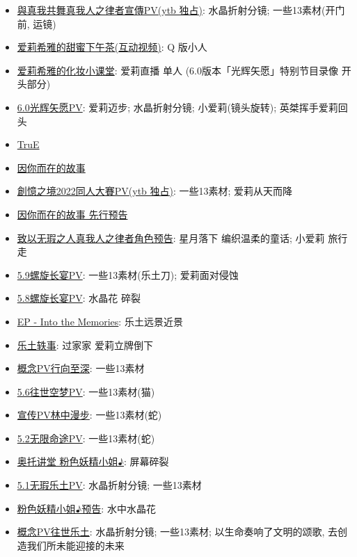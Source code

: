 \documentclass[a4paper]{article}
\begin{document}
\begin{itemize}
    \item \href{https://www.youtube.com/watch?v=mj-lnw1XlN0}{與真我共舞真我人之律者宣傳PV(ytb 独占)}: 水晶折射分镜; 一些13素材(开门前, 运镜)
    \item \href{https://www.bilibili.com/video/BV1Ta411Z7KE/}{爱莉希雅的甜蜜下午茶(互动视频)}: Q 版小人
    \item \href{https://www.bilibili.com/video/BV12T411w7CN/}{爱莉希雅的化妆小课堂}: 爱莉直播 单人 (6.0版本「光辉矢愿」特别节目录像 开头部分)
    \item \href{https://www.bilibili.com/video/BV1Mg411k7U5/}{6.0光辉矢愿PV}: 爱莉迈步; 水晶折射分镜; 小爱莉(镜头旋转); 英桀挥手爱莉回头
    \item \href{https://www.bilibili.com/video/BV1sg411y7cZ/}{TruE}
    \item \href{https://www.bilibili.com/video/BV1fY4y1F7GL/}{因你而在的故事}
    \item \href{https://www.youtube.com/watch?v=psC2zgpPuPQ}{創憶之境2022同人大賽PV(ytb 独占)}: 一些13素材; 爱莉从天而降
    \item \href{https://www.bilibili.com/video/BV1Ee4y1D7ci/}{因你而在的故事 先行预告}
    \item \href{https://www.bilibili.com/video/BV1DS4y1t7rs/}{致以无瑕之人真我人之律者角色预告}: 星月落下 编织温柔的童话; 小爱莉 旅行 走
    \item \href{https://www.bilibili.com/video/BV1Ra411X7Hr/}{5.9螺旋长宴PV}: 一些13素材(乐土刀); 爱莉面对侵蚀
    \item \href{https://www.bilibili.com/video/BV1sP4y1F7iQ/}{5.8螺旋长宴PV}: 水晶花 碎裂
    \item \href{https://www.bilibili.com/video/BV18Y4y1Y7Hc/}{EP - Into the Memories}: 乐土远景近景
    \item \href{https://www.bilibili.com/video/BV1fr4y1n787/}{乐土轶事}: 过家家 爱莉立牌倒下
    \item \href{https://www.bilibili.com/video/BV1wF411b7wo/}{概念PV行向至深}: 一些13素材
    \item \href{https://www.bilibili.com/video/BV1KL4y137Jb/}{5.6往世空梦PV}: 一些13素材(猫)
    \item \href{https://www.bilibili.com/video/BV1F341127NT/}{宣传PV林中漫步}: 一些13素材(蛇)
    \item \href{https://www.bilibili.com/video/BV1V44y1b7cf/}{5.2无限命途PV}: 一些13素材(蛇)
    \item \href{https://www.bilibili.com/video/BV1Ny4y1573D/}{奥托讲堂 粉色妖精小姐♪}: 屏幕碎裂
    \item \href{https://www.bilibili.com/video/BV1iP4y1W7Kk/}{5.1无瑕乐土PV}: 水晶折射分镜; 一些13素材
    \item \href{https://www.bilibili.com/video/BV1Nw411R7bU/}{粉色妖精小姐♪预告}: 水中水晶花
    \item \href{https://www.bilibili.com/video/BV1T64y1X7mY/}{概念PV往世乐土}: 水晶折射分镜; 一些13素材; 以生命奏响了文明的颂歌, 去创造我们所未能迎接的未来
\end{itemize}
\end{document}
